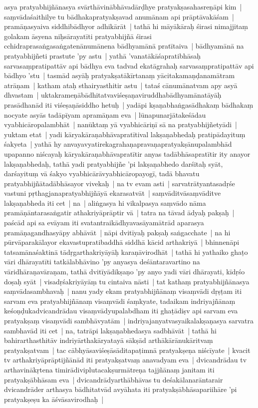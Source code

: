 \documentclass[article,12pt,a4paper]{memoir}
\begin{document}
asya pratyabhijñānasya svārthāvinābhāvadārḍhye pratyakṣasahasreṇāpi kim | saṃvādaśaithilye tu bādhakapratyakṣavad anumānam api prāptāvakāśam | pramāṇasyaiva siddhibādhyor adhikārāt | tathā hi māyākāraḥ śirasi nimajjitaṃ golakam āsyena niḥsārayatīti pratyabhijñā śirasi cchidraprasaṅgasaṅgatenānumānena bādhyamānā pratītaiva | bādhyamānā na pratyabhijñeti prastute 'py astu | \label{thakur75-116.23} yathā 'vanatākāśapratibhāsaḥ sarvasaṃpratipattāv api bādhya eva tadvad ekatāgrahaḥ sarvasaṃpratipattāv api bādhyo 'stu | tasmād asyāḥ pratyakṣatākīrtanaṃ yācitakamaṇḍanamātram atrāṇam | katham ataḥ sthairyasthitir astu | \label{thakur75-116.26} tataś cānumānatvam apy asyā dhvastam | uktakrameṇābādhitatvaviśeṣaṇaviruddhabādhyamānatāyāḥ prasādhanād iti viśeṣaṇāsiddho hetuḥ | \label{thakur75-116.27} yadāpi kṣaṇabhaṅgasādhakaṃ bādhakaṃ nocyate asyās tadāpīyam apramāṇam eva | lūnapunarjātakeśādau vyabhicāropalambhāt | \label{thakur75-1} nanūktaṃ yā vyabhicāriṇī sā na pratyabhijñetyādi | \label{thakur75-116.30} yuktam etat | yadi kāryakāraṇabhāvapratītival lakṣaṇabhedaḥ pratipādayituṃ śakyeta | yathā hy anvayavyatirekagrahaṇapravaṇapratyakṣānupalambhād upapanno niścayaḥ kāryakāraṇabhāvapratītir anyas tadābhāsapratītir ity anayor lakṣaṇabhedaḥ, tathā yadi pratyabhijñe 'pi lakṣaṇabhedo darśitaḥ syāt, darśayituṃ vā śakyo vyabhicārāvyabhicāropayogī, tadā bhavatu pratyabhijñātadābhāsayor vivekaḥ | na tv evam asti | sarvatrātyantasadṛśe vastuni pṛthagjanapratyabhijñāyā ekarasatvāt | \label{thakur75-117.3} saṃvāditvāsaṃvāditve lakṣaṇabheda iti cet | na | aliṅgasya hi vikalpasya saṃvādo nāma pramāṇāntarasaṅgatir athakriyāprāptir vā | \label{thakur75-117.4} tatra na tāvad ādyaḥ pakṣaḥ | paścād api sa evāyam iti svatantraikādhyavasāyamātrād aparasya pramāṇagandhasyāpy abhāvāt | \label{thakur75-117.6} nāpi dvitīyaḥ pakṣaḥ saṅgacchate | na hi pūrvāparakālayor ekavastupratibaddhā siddhā kācid arthakriyā | bhinnenāpi tatsamānaśaktinā tādṛgarthakriyāyāḥ karaṇāvirodhāt | tathā hi yathaiko ghaṭo vāri dhārayatīti tatkālabhāvino 'py anyasya deśāntaravartino na vāridhāraṇavāraṇam, tathā dvitīyādikṣaṇo 'py anyo yadi vāri dhārayati, kīdṛśo doṣaḥ syāt | visadṛśakriyāyāṃ tu cintaiva nāsti | tat kathaṃ pratyabhijñānasya saṃvādasambhavaḥ | \label{thakur75-117.12} nanu yady ekam pratyabhijñānaṃ visaṃvādi dṛṣṭam iti sarvam eva pratyabhijñānaṃ visaṃvādi śaṃkyate, tadaikam indriyajñānaṃ keśoṇḍukadvicandrādau visaṃvādyupalabdham iti ghaṭādiṣv api sarvam eva pratyakṣaṃ visaṃvādi sambhāvyatām | indriyajanyatvasyaikalakṣaṇasya sarvatra sambhavād iti cet | \label{thakur75-117.15} na, tatrāpi lakṣaṇabhedasya sadbhāvāt | tathā hi bahirarthasthitāv indriyārthakāryatayā sākṣād arthākārānukāritvaṃ pratyakṣatvam | tac cābhyāsaviśeṣāsāditapaṭimnā pratyakṣeṇa niścīyate | kvacit tv arthakriyāprāptijñānād iti pratyakṣatvaṃ anavadyam eva | dvicandrādau tv arthavinākṛtena timirādiviplutacakṣurmātreṇa tajjñānaṃ janitam iti pratyakṣābhāsam eva | dvicandrādyarthābhāvas tu deśakālanarāntarair dvicandrāder arthasya bādhitatvād avyāhata iti pratyakṣābhāsapariihāre 'pi pratyakṣeṣu ka āśvāsavirodhaḥ | 
\end{document}
